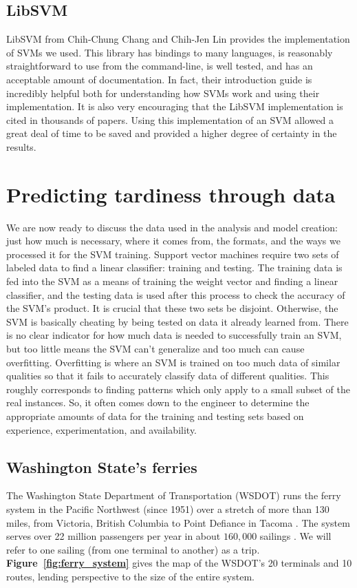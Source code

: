 \documentclass[11pt]{article} %
\begin{document}
\subsection{LibSVM}
\label{sec:libsvm}
LibSVM \cite{chang2011libsvm} from Chih-Chung Chang and Chih-Jen Lin provides the
implementation of SVMs we used.  This library has bindings to many languages, is 
reasonably straightforward to use from the command-line, is well tested, and has an 
acceptable amount of documentation. In fact, their introduction guide 
\cite{chang2011libsvm} is incredibly helpful both for understanding how SVMs work
and using their implementation. It is also very encouraging that the LibSVM 
implementation is cited in thousands of papers.  Using this implementation of an 
SVM allowed a great deal of time to be saved and provided a higher degree of 
certainty in the results.

\section{Predicting tardiness through data}
\label{sec:problem}
We are now ready to discuss the data used in the analysis and model creation: 
just how much is necessary, where it comes from, the formats, and the ways we
processed it for the SVM training.
Support vector machines require two sets of labeled data to find a linear classifier:
training and testing. The training data is fed into the SVM as a means of training
the weight vector and finding a linear classifier, and the testing data is used
after this process to check the accuracy of the SVM's product. It is crucial that
these two sets be disjoint. Otherwise, the SVM is basically cheating by being
tested on data it already learned from. There is no clear indicator for how much data
is needed to successfully train an SVM, but too little means the SVM can't 
generalize and too much can cause overfitting. Overfitting is where an SVM is
trained on too much data of similar qualities so that it fails to accurately
classify data of different qualities. This roughly corresponds to finding patterns
which only apply to a small subset of the real instances.  So, it often comes
down to the engineer to determine the appropriate amounts of data for the training
and testing sets based on experience, experimentation, and availability.



\subsection{Washington State's ferries}
\label{sec:wsdot}
The Washington State Department of Transportation (WSDOT) runs the ferry system
in the Pacific Northwest (since 1951) over a stretch of more than 130 miles, from 
Victoria, British Columbia to Point Defiance in Tacoma \cite{wsdotFleet}. The system 
serves over 22 million passengers per year in about $160,000$ sailings 
\cite{wsfTraffic}.  We will refer to one sailing (from one terminal to another) as a 
trip.  \textbf{Figure~\ref{fig:ferry_system}} gives the map of the WSDOT's 20 
terminals and 10 routes, lending perspective to the size of the entire system.
\end{document}
